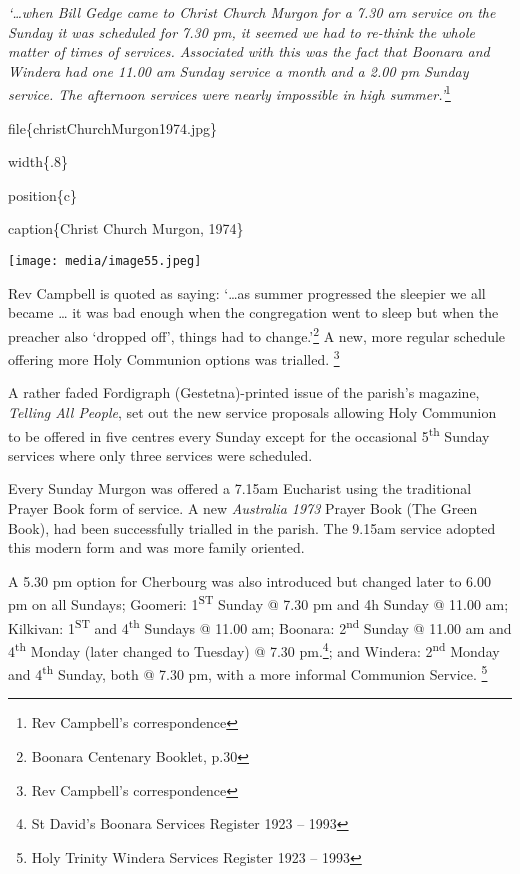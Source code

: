 \emph{`\ldots when Bill Gedge came to Christ Church Murgon for a 7.30 am service on the Sunday it was scheduled for 7.30 pm, it seemed we had to re-think the whole matter of times of services. Associated with this was the fact that Boonara and Windera had one 11.00 am Sunday service a month and a 2.00 pm Sunday service. The afternoon services were nearly impossible in high summer.'}\footnote{Rev Campbell's correspondence}

file\{christChurchMurgon1974.jpg\}

width\{.8\}

position\{c\}

caption\{Christ Church Murgon, 1974\}

\texttt{[image: media/image55.jpeg]}

Rev Campbell is quoted as saying: `\ldots as summer progressed the sleepier we all became \ldots{} it was bad enough when the congregation went to sleep but when the preacher also `dropped off', things had to change.'\footnote{Boonara Centenary Booklet, p.30} A new, more regular schedule offering more Holy Communion options was trialled. \footnote{Rev Campbell's correspondence}

A rather faded Fordigraph (Gestetna)-printed issue of the parish's magazine, \emph{Telling All People}, set out the new service proposals allowing Holy Communion to be offered in five centres every Sunday except for the occasional 5\textsuperscript{th} Sunday services where only three services were scheduled.

Every Sunday Murgon was offered a 7.15am Eucharist using the traditional Prayer Book form of service. A new \emph{Australia 1973} Prayer Book (The Green Book), had been successfully trialled in the parish. The 9.15am service adopted this modern form and was more family oriented.

A 5.30 pm option for Cherbourg was also introduced but changed later to 6.00 pm on all Sundays; Goomeri: 1\textsuperscript{ST} Sunday @ 7.30 pm and 4h Sunday @ 11.00 am; Kilkivan: 1\textsuperscript{ST} and 4\textsuperscript{th} Sundays @ 11.00 am; Boonara: 2\textsuperscript{nd} Sunday @ 11.00 am and 4\textsuperscript{th} Monday (later changed to Tuesday) @ 7.30 pm.\footnote{St David's Boonara Services Register 1923 -- 1993}; and Windera: 2\textsuperscript{nd} Monday and 4\textsuperscript{th} Sunday, both @ 7.30 pm, with a more informal Communion Service. \footnote{Holy Trinity Windera Services Register 1923 -- 1993}

